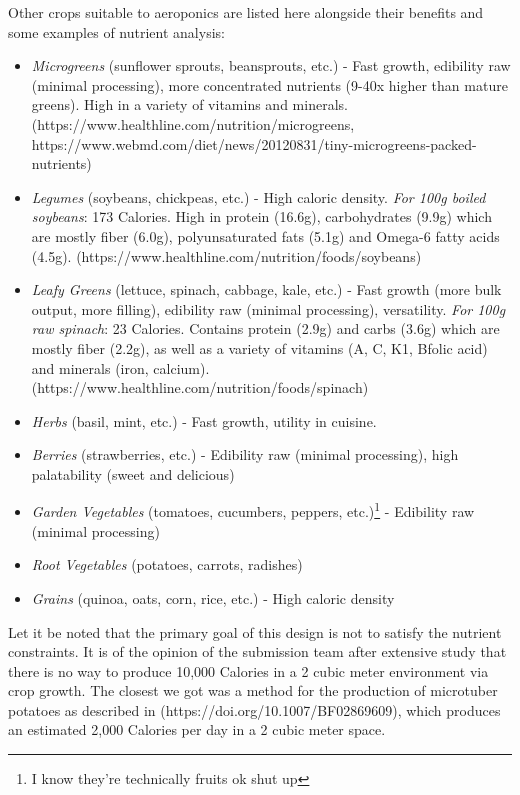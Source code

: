 \documentclass{report}
\begin{document}
Other crops suitable to aeroponics are listed here alongside their benefits and some examples of nutrient analysis:
\begin{itemize}
    \item \textit{Microgreens} (sunflower sprouts, beansprouts, etc.) - Fast growth, edibility raw (minimal processing), more concentrated nutrients (9-40x higher than mature greens). High in a variety of vitamins and minerals. (https://www.healthline.com/nutrition/microgreens, https://www.webmd.com/diet/news/20120831/tiny-microgreens-packed-nutrients)
    \item \textit{Legumes} (soybeans, chickpeas, etc.) - High caloric density. \textit{For 100g boiled soybeans}: 173 Calories. High in protein (16.6g), carbohydrates (9.9g) which are mostly fiber (6.0g), polyunsaturated fats (5.1g) and Omega-6 fatty acids (4.5g). (https://www.healthline.com/nutrition/foods/soybeans)
    \item \textit{Leafy Greens} (lettuce, spinach, cabbage, kale, etc.) - Fast growth (more bulk output, more filling), edibility raw (minimal processing), versatility. \textit{For 100g raw spinach}: 23 Calories. Contains protein (2.9g) and carbs (3.6g) which are mostly fiber (2.2g), as well as a variety of vitamins (A, C, K1, Bfolic acid) and minerals (iron, calcium). (https://www.healthline.com/nutrition/foods/spinach)
    \item \textit{Herbs} (basil, mint, etc.) - Fast growth, utility in cuisine.
    \item \textit{Berries} (strawberries, etc.) - Edibility raw (minimal processing), high palatability (sweet and delicious)
    \item \textit{Garden Vegetables} (tomatoes, cucumbers, peppers, etc.)\footnote{I know they're technically fruits ok shut up} - Edibility raw (minimal processing)
    \item \textit{Root Vegetables} (potatoes, carrots, radishes)
    \item \textit{Grains} (quinoa, oats, corn, rice, etc.) - High caloric density
\end{itemize}

Let it be noted that the primary goal of this design is not to satisfy the nutrient constraints. It is of the opinion of the submission team after extensive study that there is no way to produce 10,000 Calories in a 2 cubic meter environment via crop growth. The closest we got was a method for the production of microtuber potatoes as described in (https://doi.org/10.1007/BF02869609), which produces an estimated 2,000 Calories per day in a 2 cubic meter space.
\end{document}
